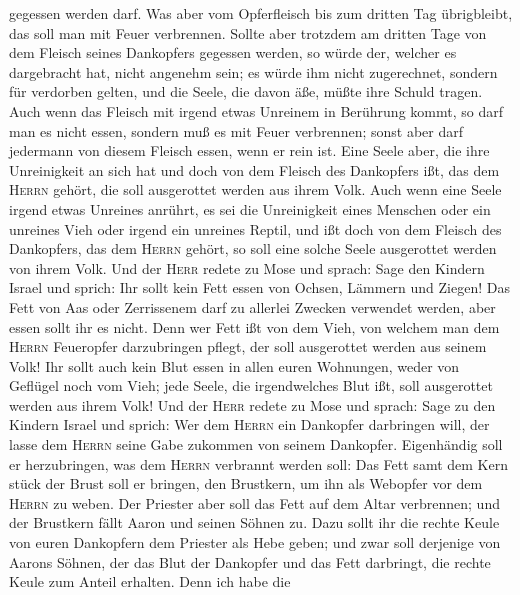 gegessen werden darf.  Was aber vom Opferfleisch bis zum
dritten Tag übrigbleibt, das soll man mit Feuer verbrennen.
 Sollte aber trotzdem am dritten Tage von dem Fleisch
seines Dankopfers gegessen werden, so würde der, welcher es dargebracht
hat, nicht angenehm sein; es würde ihm nicht zugerechnet, sondern für
verdorben gelten, und die Seele, die davon äße, müßte ihre Schuld
tragen.  Auch wenn das Fleisch mit irgend etwas Unreinem
in Berührung kommt, so darf man es nicht essen, sondern muß es mit Feuer
verbrennen; sonst aber darf jedermann von diesem Fleisch essen, wenn er
rein ist.  Eine Seele aber, die ihre Unreinigkeit an sich
hat und doch von dem Fleisch des Dankopfers ißt, das dem \textsc{Herrn}
gehört, die soll ausgerottet werden aus ihrem Volk.  Auch
wenn eine Seele irgend etwas Unreines anrührt, es sei die Unreinigkeit
eines Menschen oder ein unreines Vieh oder irgend ein unreines Reptil,
und ißt doch von dem Fleisch des Dankopfers, das dem \textsc{Herrn}
gehört, so soll eine solche Seele ausgerottet werden von ihrem Volk.
 Und der \textsc{Herr} redete zu Mose und sprach:
 Sage den Kindern Israel und sprich: Ihr sollt kein Fett
essen von Ochsen, Lämmern und Ziegen!  Das Fett von Aas
oder Zerrissenem darf zu allerlei Zwecken verwendet werden, aber essen
sollt ihr es nicht.  Denn wer Fett ißt von dem Vieh, von
welchem man dem \textsc{Herrn} Feueropfer darzubringen pflegt, der soll
ausgerottet werden aus seinem Volk!  Ihr sollt auch kein
Blut essen in allen euren Wohnungen, weder von Geflügel noch vom Vieh;
 jede Seele, die irgendwelches Blut ißt, soll ausgerottet
werden aus ihrem Volk!  Und der \textsc{Herr} redete zu
Mose und sprach:  Sage zu den Kindern Israel und sprich:
Wer dem \textsc{Herrn} ein Dankopfer darbringen will, der lasse dem
\textsc{Herrn} seine Gabe zukommen von seinem Dankopfer. 
Eigenhändig soll er herzubringen, was dem \textsc{Herrn} verbrannt
werden soll: Das Fett samt dem Kern stück der Brust soll er bringen, den
Brustkern, um ihn als Webopfer vor dem \textsc{Herrn} zu weben.
 Der Priester aber soll das Fett auf dem Altar
verbrennen; und der Brustkern fällt Aaron und seinen Söhnen zu.
 Dazu sollt ihr die rechte Keule von euren Dankopfern dem
Priester als Hebe geben;  und zwar soll derjenige von
Aarons Söhnen, der das Blut der Dankopfer und das Fett darbringt, die
rechte Keule zum Anteil erhalten.  Denn ich habe die
